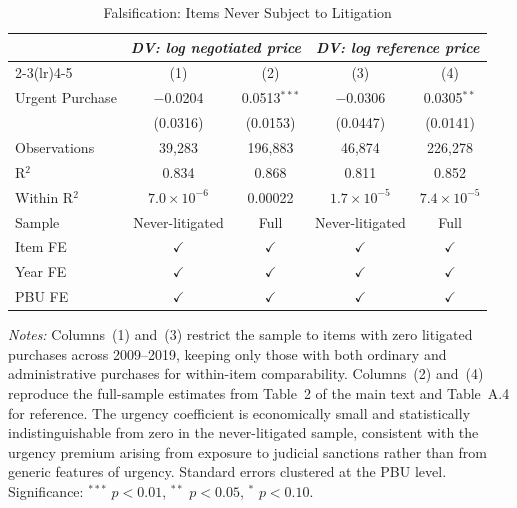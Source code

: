 \begin{table}[ht]
  \centering
  \caption{Falsification: Items Never Subject to Litigation}
  \label{tab:placebo}
  \small
  \begin{threeparttable}
  \begin{tabular}{lcccc}
    \toprule
    & \multicolumn{2}{c}{\textit{DV: log negotiated price}}
    & \multicolumn{2}{c}{\textit{DV: log reference price}} \\
    \cmidrule(lr){2-3}\cmidrule(lr){4-5}
                           & (1)                      & (2)            & (3)                      & (4)           \\
    \midrule
    Urgent Purchase        & $-$0.0204                & 0.0513$^{***}$ & $-$0.0306                & 0.0305$^{**}$ \\
                           & (0.0316)                 & (0.0153)       & (0.0447)                 & (0.0141)      \\[3pt]
    \midrule
    Observations           & 39{,}283                 & 196{,}883      & 46{,}874                 & 226{,}278     \\
    R$^2$                  & 0.834                    & 0.868          & 0.811                    & 0.852         \\
    Within R$^2$           & $7.0\!\times\!10^{-6}$   & 0.00022        & $1.7\!\times\!10^{-5}$   & $7.4\!\times\!10^{-5}$ \\
    \midrule
    Sample                 & Never-litigated          & Full           & Never-litigated          & Full          \\
    Item FE                & $\checkmark$             & $\checkmark$   & $\checkmark$             & $\checkmark$  \\
    Year FE                & $\checkmark$             & $\checkmark$   & $\checkmark$             & $\checkmark$  \\
    PBU FE                 & $\checkmark$             & $\checkmark$   & $\checkmark$             & $\checkmark$  \\
    \bottomrule
  \end{tabular}
  \begin{tablenotes}
    \small
    \item \textit{Notes:} Columns~(1) and~(3) restrict the sample to items
    with zero litigated purchases across 2009--2019, keeping only those
    with both ordinary and administrative purchases for within-item
    comparability. Columns~(2) and~(4) reproduce the full-sample estimates
    from Table~2 of the main text and Table~A.4 for reference.
    The urgency coefficient is economically small and statistically
    indistinguishable from zero in the never-litigated sample, consistent
    with the urgency premium arising from exposure to judicial sanctions
    rather than from generic features of urgency. Standard errors
    clustered at the PBU level. Significance: $^{***}$ $p<0.01$,
    $^{**}$ $p<0.05$, $^{*}$ $p<0.10$.
  \end{tablenotes}
  \end{threeparttable}
\end{table}
